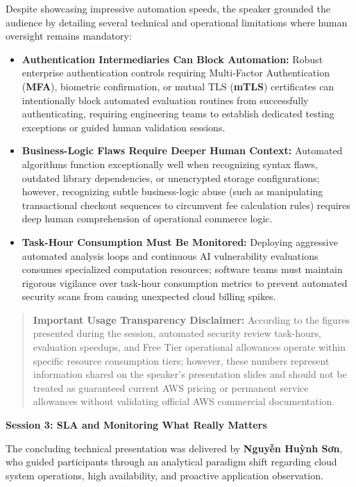 Despite showcasing impressive automation speeds, the speaker grounded
the audience by detailing several technical and operational limitations
where human oversight remains mandatory:

\begin{itemize}
\tightlist
\item
  \textbf{Authentication Intermediaries Can Block Automation:} Robust
  enterprise authentication controls requiring Multi-Factor
  Authentication (\textbf{MFA}), biometric confirmation, or mutual TLS
  (\textbf{mTLS}) certificates can intentionally block automated
  evaluation routines from successfully authenticating, requiring
  engineering teams to establish dedicated testing exceptions or guided
  human validation sessions.
\item
  \textbf{Business-Logic Flaws Require Deeper Human Context:} Automated
  algorithms function exceptionally well when recognizing syntax flaws,
  outdated library dependencies, or unencrypted storage configurations;
  however, recognizing subtle business-logic abuse (such as manipulating
  transactional checkout sequences to circumvent fee calculation rules)
  requires deep human comprehension of operational commerce logic.
\item
  \textbf{Task-Hour Consumption Must Be Monitored:} Deploying aggressive
  automated analysis loops and continuous AI vulnerability evaluations
  consumes specialized computation resources; software teams must
  maintain rigorous vigilance over task-hour consumption metrics to
  prevent automated security scans from causing unexpected cloud billing
  spikes.
\end{itemize}

\begin{quote}
\textbf{Important Usage Transparency Disclaimer:} According to the
figures presented during the session, automated security review
task-hours, evaluation speedups, and Free Tier operational allowances
operate within specific resource consumption tiers; however, these
numbers represent information shared on the speaker's presentation
slides and should not be treated as guaranteed current AWS pricing or
permanent service allowances without validating official AWS commercial
documentation.
\end{quote}

\vspace{0.5em}\noindent\textbf{Session 3: SLA and Monitoring What Really
Matters}\par

The concluding technical presentation was delivered by \textbf{Nguyễn
Huỳnh Sơn}, who guided participants through an analytical paradigm shift
regarding cloud system operations, high availability, and proactive
application observation.

